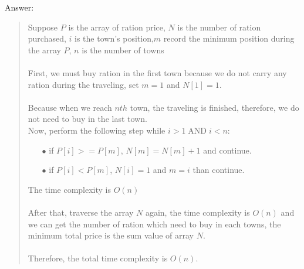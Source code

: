 \documentclass{article}
\DeclareMathOperator{\AND}{AND}
\begin{document}
\begin{Question}
\begin{Subquestion}
\begin{answer}
Answer:
\begin{quote}
    Suppose $P$ is the array of ration price, $N$ is the number of ration purchased, $i$ is the town's position,$m$ record the minimum position during the array $P$, $n$ is the number of towns\\\\
    First, we must buy ration in the first town because we do not carry any ration during the traveling, set $m = 1$ and $N[1] = 1$.\\\\
    Because when we reach $nth$ town, the traveling is finished, therefore, we do not need to buy in the last town.\\ 
    Now, perform the following step while $ i > 1 \AND i < n $:
    \begin{itemize}
        \item [$\bullet$] if $P[i] >= P[m]$, $N[m] = N[m] + 1$ and continue.
        \item [$\bullet$] if $P[i] < P[m]$, $N[i] = 1$ and $m = i$ than continue.\\
    \end{itemize}
    The time complexity is $O(n)$\\\\
    After that, traverse the array $N$ again, the time complexity is $O(n)$ and we can get the number of ration which need to buy in each towns, the minimum total price is the sum value of array $N$.\\\\
    Therefore, the total time complexity is $O(n)$.\\
\end{quote}
\end{answer}
\end{Subquestion}
\end{Question}
\end{document}
